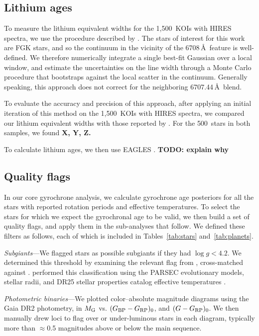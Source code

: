 \documentclass[11pt,twocolumn,tighten]{aastex63}
\newcommand{\nkoiswithhires}{{1{,}500}}
\newcommand{\nbergeroverlap}{{500}}
\begin{document}
\subsection{Lithium ages}
To measure the lithium equivalent widths for the \nkoiswithhires\ KOIs
with HIRES spectra, we use the procedure described by
\citet{Bouma_2021}.
The stars of interest for this work are FGK stars, and so the
continuum in the vicinity of the
 6708\,\AA\ feature is well-defined.
We therefore numerically integrate a single best-fit Gaussian over a
local window, and estimate the uncertainties on the line width through
a Monte Carlo procedure that bootstraps against the local scatter in the
continuum.
Generally speaking, this approach does not correct for the neighboring
 6707.44\,\AA\ blend.

To evaluate the accuracy and precision of this approach, after
applying an initial iteration of this method on the \nkoiswithhires\
KOIs with HIRES spectra, we compared our lithium equivalent widths
with those reported by \citet{Berger_2018}.
For the \nbergeroverlap\ stars in both samples, 
we found {\bf X, Y, Z.}

To calculate lithium ages, we then use EAGLES \citep{Jeffries_2023}.
{\bf TODO: explain why}



\subsection{Quality flags}
In our core gyrochrone analysis, we calculate gyrochrone age
posteriors for all the stars with reported rotation periods and
effective temperatures.  To select the stars for which we expect the
gyrochronal age to be valid, we then build a set of quality flags, and
apply them in the sub-analyses that follow.  We defined these filters
as follows, each of which is included in Tables~\ref{tab:stars}
and~\ref{tab:planets}.

{\it Subgiants}---We flagged stars as possible subgiants if they had
$\log g < 4.2$.  We determined this threshold by examining the
relevant flag from \citet{berger_2018_radii_evolnstates},
cross-matched against \citet{Berger_2020a_catalog}.
\citet{berger_2018_radii_evolnstates} performed this classification
using the PARSEC evolutionary models, stellar radii, and DR25 stellar
properties catalog effective temperatures \citep{Mathur_2017}.

{\it Photometric binaries}---We plotted color--absolute magnitude
diagrams using the Gaia DR2 photometry, in $M_{\rm G}$ vs. $(G_{\rm
BP} - G_{\rm RP})_0$, and $(G - G_{\rm RP})_0$.  We then manually drew
loci to flag over or under-luminous stars in each diagram, typically
more than $\approx$0.5 magnitudes above or below the main sequence.
\end{document}

